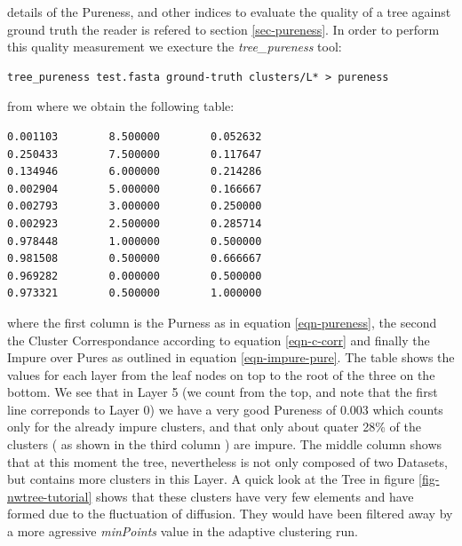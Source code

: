 details of the Pureness, and other indices to evaluate the quality of
a tree against ground truth the reader is refered to section
\ref{sec-pureness}. In order to perform this quality measurement we
execture the \emph{tree\_pureness} tool:
\begin{lstlisting}
tree_pureness test.fasta ground-truth clusters/L* > pureness
\end{lstlisting}
from where we obtain the following table:
\begin{lstlisting}
0.001103        8.500000        0.052632
0.250433        7.500000        0.117647
0.134946        6.000000        0.214286
0.002904        5.000000        0.166667
0.002793        3.000000        0.250000
0.002923        2.500000        0.285714
0.978448        1.000000        0.500000
0.981508        0.500000        0.666667
0.969282        0.000000        0.500000
0.973321        0.500000        1.000000
\end{lstlisting}
where the first column is the Purness as in equation
\ref{eqn-pureness}, the second the Cluster Correspondance according to
equation \ref{eqn-c-corr} and finally the Impure over Pures as
outlined in equation \ref{eqn-impure-pure}. The table shows the values
for each layer from the leaf nodes on top to the root of the three on
the bottom. We see that in Layer 5 (we count from the top, and note
that the first line correponds to Layer 0)
we have a very good Pureness of 0.003 which counts only for the
already impure clusters, and that only about quater 28\% of the
clusters ( as shown in the third column ) are impure. The middle
column shows that at this moment the tree, nevertheless is not only
composed of two Datasets, but contains more clusters in this Layer. A
quick look at the Tree in figure \ref{fig-nwtree-tutorial} shows that
these clusters have very few elements and have formed due to the
fluctuation of diffusion. They would have been filtered away by a more
agressive \emph{minPoints} value in the adaptive clustering run.



